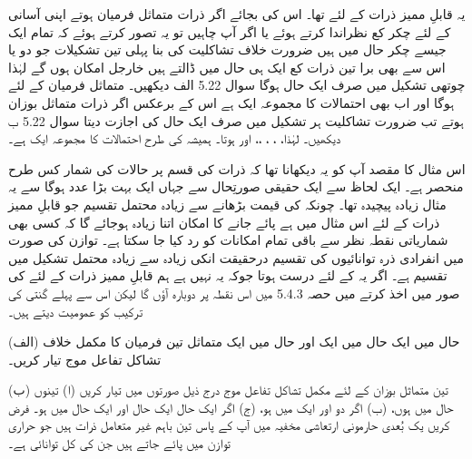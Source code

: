 یہ قابلِ ممیز ذرات کے لئے تھا۔ اس کی بجائے اگر ذرات متماثل فرمیان ہوتے اپنی آسانی کے لئے چکر کع نظراندا کرتے ہوئے یا اگر آپ چاہیں تو یہ تصور کرتے ہوئے کہ تمام ایک جیسے چکر حال میں ہیں ضرورت خلاف تشاکلیت کی بنا پہلی تین تشکیلات  جو دو یا اس سے بھی برا تین ذرات کع ایک ہی حال میں ڈالتے ہیں خارجل امکان ہوں گے لہٰذا چوتھی تشکیل میں صرف ایک حال ہوگا سوال \num{5.22} الف دیکھیں۔ متماثل فرمیان کے لئے  ہوگا اور اب بھی احتمالات کا مجموعہ ایک ہے اس کے برعکس اگر ذرات متماثل بوزان ہوتے تب ضرورت تشاکلیت ہر تشکیل میں صرف ایک حال کی اجازت دیتا سوال \num{5.22} ب دیکھیں۔ لہٰذا، ، ، ،،  اور  ہوتا۔ ہمیشہ کی طرح احتمالات کا مجموعہ ایک ہے۔

اس مثال کا مقصد آپ کو یہ دیکھانا تھا کہ ذرات کی قسم پر حالات کی شمار کس طرح منحصر ہے۔ ایک لحاظ سے ایک حقیقی صورتِحال سے جہاں  ایک بہت بڑا عدد ہوگا سے یہ مثال زیادہ پیچیدہ تھا۔ چونکہ  کی قیمت بڑھانے سے زیادہ محتمل تقسیم جو قابلِ ممیز ذرات کے لئے اس مثال میں  ہے پائے جانے کا امکان اتنا زیادہ ہوجائے گا کہ کسی بھی شماریاتی نقطہ نظر سے باقی تمام امکانات کو رد کیا جا سکتا ہے۔ توازن کی صورت میں انفرادی ذرہ توانائیوں کی تقسیم درحقیقت انکی زیادہ سے زیادہ محتمل تشکیل میں تقسیم ہے۔ اگر یہ   کے لئے درست ہوتا جوکہ یہ نہیں ہے ہم قابلِ ممیز ذرات کے لئے  کی صور میں اخذ کرتے  میں حصہ 5.4.3 میں اس نقطہ پر دوبارہ آؤں گا لیکن اس سے پہلے گنتی کی ترکیب کو عمومیت دیتے ہیں۔


(الف) حال  میں ایک حال  میں ایک اور حال  میں ایک متماثل تین فرمیان کا مکمل خلاف تشاکل تفاعل موج  تیار کریں۔

(ب) تین متماثل بوزان کے لئے مکمل تشاکل تفاعل موج درج ذیل صورتوں میں تیار کریں (ا) تینوں حال  میں ہوں، (ب) اگر دو  اور ایک  میں ہو، (ج) اگر ایک حال  ایک حال  اور ایک حال  میں ہو۔ 
فرض کریں یک بُعدی حارمونی ارتعاشی مخفیہ میں آپ کے پاس تین باہم غیر متعامل ذرات ہیں جو حراری توازن میں پائے جاتے ہیں جن کی کل توانائی ہے۔

